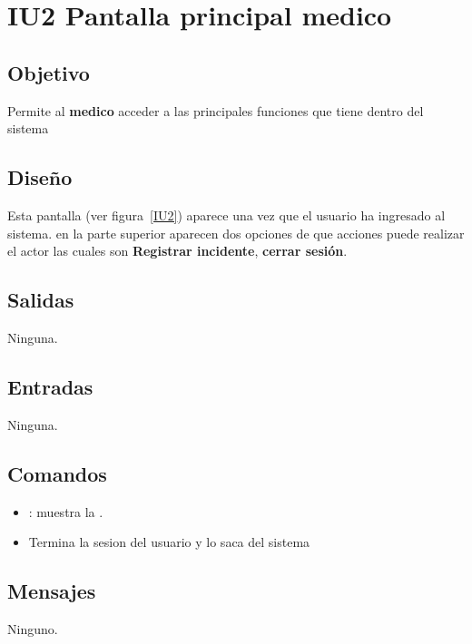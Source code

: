 \newpage
\section{IU2 Pantalla principal medico}

\subsection{Objetivo}
	Permite al {\bf medico} acceder a las principales funciones que tiene dentro del sistema

\subsection{Diseño}
	Esta pantalla  (ver figura~\ref{IU2}) aparece una vez que el usuario ha ingresado al sistema. 
 en la parte superior aparecen dos opciones de que acciones puede realizar el actor las cuales son {\bf Registrar incidente}, {\bf cerrar sesión}. 

 

\subsection{Salidas}

	Ninguna.

\subsection{Entradas}
        Ninguna.

\subsection{Comandos}
\begin{itemize}
	\item {}: muestra la .
        \item {}Termina la sesion del usuario y lo saca del sistema
\end{itemize}

\subsection{Mensajes}

            Ninguno.
